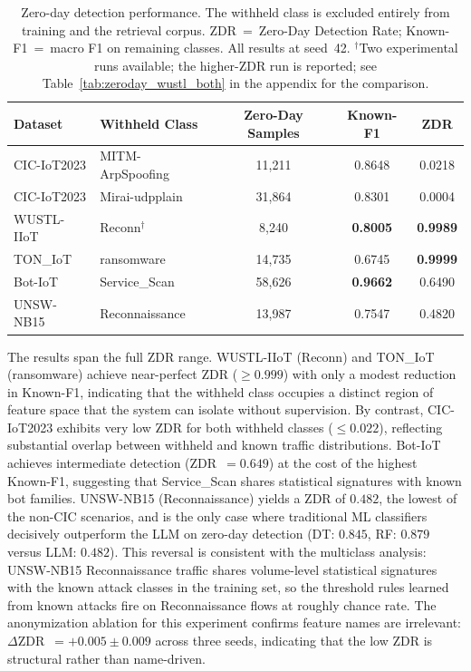 \begin{table}[htbp]
\centering
\caption{Zero-day detection performance. The withheld class is excluded entirely
  from training and the retrieval corpus. ZDR~=~Zero-Day Detection Rate;
  Known-F1~=~macro F1 on remaining classes. All results at seed~42.
  $^\dagger$Two experimental runs available; the higher-ZDR run is reported;
  see Table~\ref{tab:zeroday_wustl_both} in the appendix for the comparison.}
\label{tab:zeroday_summary}
\begin{tabular}{llccc}
\toprule
\textbf{Dataset} & \textbf{Withheld Class} & \textbf{Zero-Day Samples} & \textbf{Known-F1} & \textbf{ZDR} \\
\midrule
CIC-IoT2023  & MITM-ArpSpoofing  & 11{,}211 & 0.8648 & 0.0218 \\
CIC-IoT2023  & Mirai-udpplain    & 31{,}864 & 0.8301 & 0.0004 \\
WUSTL-IIoT   & Reconn$^\dagger$  & 8{,}240  & \textbf{0.8005} & \textbf{0.9989} \\
TON\_IoT     & ransomware        & 14{,}735 & 0.6745 & \textbf{0.9999} \\
Bot-IoT      & Service\_Scan     & 58{,}626 & \textbf{0.9662} & 0.6490 \\
UNSW-NB15    & Reconnaissance    & 13{,}987 & 0.7547 & 0.4820 \\
\bottomrule
\end{tabular}
\end{table}

The results span the full ZDR range. WUSTL-IIoT (Reconn) and TON\_IoT
(ransomware) achieve near-perfect ZDR ($\geq 0.999$) with only a modest
reduction in Known-F1, indicating that the withheld class occupies a distinct
region of feature space that the system can isolate without supervision. By
contrast, CIC-IoT2023 exhibits very low ZDR for both withheld classes
($\leq 0.022$), reflecting substantial overlap between withheld and known
traffic distributions. Bot-IoT achieves intermediate detection
(ZDR~$= 0.649$) at the cost of the highest Known-F1, suggesting that
Service\_Scan shares statistical signatures with known bot families.
UNSW-NB15 (Reconnaissance) yields a ZDR of $0.482$, the lowest of the
non-CIC scenarios, and is the only case where traditional ML classifiers
decisively outperform the LLM on zero-day detection
(DT: $0.845$, RF: $0.879$ versus LLM: $0.482$).
This reversal is consistent with the multiclass analysis: UNSW-NB15
Reconnaissance traffic shares volume-level statistical signatures with the
known attack classes in the training set, so the threshold rules learned from
known attacks fire on Reconnaissance flows at roughly chance rate.
The anonymization ablation for this experiment confirms feature names are
irrelevant: $\Delta$ZDR~$= +0.005 \pm 0.009$ across three seeds, indicating
that the low ZDR is structural rather than name-driven.

